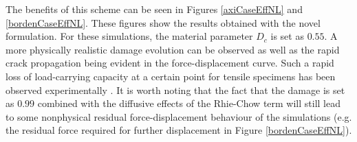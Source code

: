 \documentclass[sn-mathphys,Numbered,draft]{sn-jnl}%
\begin{document}
The benefits of this scheme can be seen in Figures \ref{axiCaseEffNL} and \ref{bordenCaseEffNL}. These figures show the results obtained with the novel formulation. For these simulations, the material parameter $D_c$ is set as $0.55$. A more physically realistic damage evolution can be observed as well as the rapid crack propagation being evident in the force-displacement curve. Such a rapid loss of load-carrying capacity at a certain point for tensile specimens has been observed experimentally \cite{li_ductile_2011,malcher_improved_2014}. It is worth noting that the fact that the damage is set as $0.99$ combined with the diffusive effects of the Rhie-Chow term will still lead to some nonphysical residual force-displacement behaviour of the simulations (e.g. the residual force required for further displacement in Figure \ref{bordenCaseEffNL}).
\end{document}

